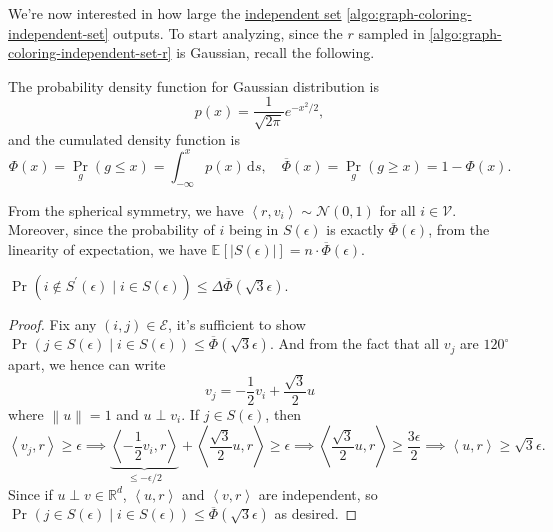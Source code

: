 We're now interested in how large the \hyperref[def:independent-set]{independent set} \autoref{algo:graph-coloring-independent-set} outputs. To start analyzing, since the \(r\) sampled in \autoref{algo:graph-coloring-independent-set-r} is Gaussian, recall the following.

\begin{prev}
	The probability density function for Gaussian distribution is
	\[
		p(x) = \frac{1}{\sqrt{2\pi } }e^{- x^{2} / 2},
	\]
	and the cumulated density function is
	\[
		\Phi (x) = \Pr_{g}(g \leq x) = \int_{-\infty}^{x} p(x) \,\mathrm{d}s, \quad \overline{\Phi }(x) = \Pr_{g}(g \geq x) = 1 - \Phi (x).
	\]
\end{prev}

From the spherical symmetry, we have \(\left\langle r, v_i \right\rangle \sim \mathcal{N} (0, 1)\) for all \(i\in \mathcal{V} \). Moreover, since the probability of \(i\) being in \(S(\epsilon )\) is exactly \(\overline{\Phi }(\epsilon )\), from the linearity of expectation, we have \(\mathbb{E}_{}\left[\left\vert S(\epsilon ) \right\vert\right] = n\cdot \overline{\Phi }(\epsilon )\).

\begin{lemma}\label{lma:lec18}
	\(\Pr_{}(i \notin S^\prime (\epsilon )\mid i\in S(\epsilon )) \leq \Delta \overline{\Phi }(\sqrt{3}\epsilon)\).
\end{lemma}
\begin{proof}
	Fix any \((i, j)\in \mathcal{E} \), it's sufficient to show \(\Pr_{}(j\in S(\epsilon )\mid i\in S(\epsilon )) \leq \overline{\Phi}(\sqrt{3}\epsilon)\). And from the fact that all \(v_j\) are \(120^{\circ } \) apart, we hence can write
	\[
		v_j = - \frac{1}{2} v_i + \frac{\sqrt{3}}{2} u
	\]
	where \(\left\lVert u\right\rVert = 1\) and \(u\perp v_i\). If \(j\in S(\epsilon )\), then
	\[
		\left\langle v_j , r \right\rangle \geq \epsilon
		\implies \underbrace{\left\langle -\frac{1}{2}v_i, r \right\rangle}_{\leq - \epsilon / 2} + \left\langle \frac{\sqrt{3}}{2}u, r \right\rangle \geq \epsilon
		\implies \left\langle \frac{\sqrt{3} }{2} u, r \right\rangle \geq \frac{3\epsilon}{2}
		\implies \left\langle u, r \right\rangle \geq \sqrt{3}\epsilon .
	\]
	Since if \(u\perp v\in \mathbb{R} ^d\), \(\left\langle u, r \right\rangle \) and \(\left\langle v, r \right\rangle \) are independent, so \(\Pr_{}(j\in S(\epsilon )\mid i\in S(\epsilon )) \leq \overline{\Phi }(\sqrt{3} \epsilon )\) as desired.
\end{proof}

